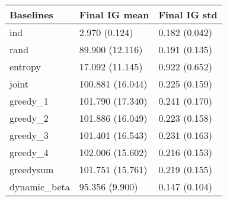 \begin{tabular}{lll}
\toprule
    Baselines &     Final IG mean &   Final IG std \\
\midrule
          ind &     2.970 (0.124) &  0.182 (0.042) \\
         rand &   89.900 (12.116) &  0.191 (0.135) \\
      entropy &   17.092 (11.145) &  0.922 (0.652) \\
        joint &  100.881 (16.044) &  0.225 (0.159) \\
     greedy\_1 &  101.790 (17.340) &  0.241 (0.170) \\
     greedy\_2 &  101.886 (16.049) &  0.223 (0.158) \\
     greedy\_3 &  101.401 (16.543) &  0.231 (0.163) \\
     greedy\_4 &  102.006 (15.602) &  0.216 (0.153) \\
    greedysum &  101.751 (15.761) &  0.219 (0.155) \\
 dynamic\_beta &    95.356 (9.900) &  0.147 (0.104) \\
\bottomrule
\end{tabular}
